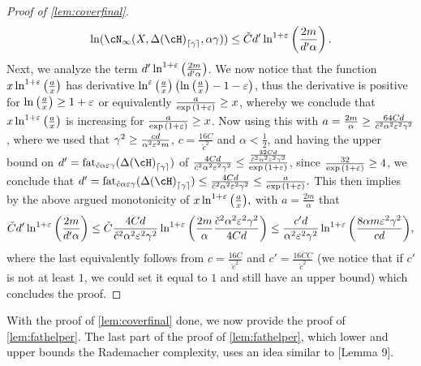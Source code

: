 \begin{proof}[Proof of \cref{lem:coverfinal}]
   \begin{align*}
       \ln(\cN_{\infty}(X, \dlh_{\left\lceil\gamma\right\rceil}, \alpha \gamma)) \leq
       \check{C} 
       d'
       \ln^{1+\eps}\left(\frac{2m}{d' \alpha}\right).
   \end{align*}
   Next, we analyze the term $d' \ln^{1+\varepsilon}\left(\frac{2m}{d' \alpha}\right)$. 
   We now notice that the function $ x\ln^{1+\varepsilon}{\left(\frac{a}{x} \right)} $  has derivative  $\ln^{\varepsilon}{\left(\frac{a}{x} \right)} \left(\ln{\left(\frac{a}{x} \right)}-1-\varepsilon \right)$, thus the derivative is positive for $ \ln{\left(\frac{a}{x} \right)}\geq 1+\varepsilon $ or equivalently $ \frac{ a }{\exp{\left(1+\varepsilon\right)}}\geq x $, whereby we conclude that $ x\ln^{1+\varepsilon}{\left(\frac{a}{x} \right)} $ is increasing for $ \frac{ a }{\exp{\left(1+\varepsilon\right)}}\geq x $. Now using this with $ a=\frac{2m}{\alpha}\geq \frac{64Cd}{\check{c}^2\alpha^2\varepsilon^2\gamma^2} $, where we used that $ \gamma^{2}\geq  \frac{cd}{\alpha^{2}\varepsilon^{2}m}$, $ c=\frac{16C}{\check{c}^{2}} $   and   $ \alpha < \frac{1}{2} $, and having the upper bound on $ d'=\fat_{\check{c}\alpha\eps\gamma}(\dlh_{\left\lceil\gamma\right\rceil}) $ of $ \frac{4Cd}{\check{c}^2\alpha^2\varepsilon^2\gamma^2} \leq \frac{\frac{32Cd}{\check{c}^2\alpha^2\varepsilon^2\gamma^2}}{ \exp{\left(1+\varepsilon\right)} } $, since $  \frac{32}{\exp{\left(1+\varepsilon\right)}}\geq 4  $, we conclude that $ d'=\fat_{\check{c}\alpha\eps\gamma}(\dlh_{\left\lceil\gamma\right\rceil})\leq \frac{4Cd}{\check{c}^2\alpha^2\eps^2\gamma^2}\leq \frac{a}{ \exp{\left(1+\eps \right)} }.$ This then implies by the above argued monotonicity of $ x\ln^{1+\varepsilon}{\left(\frac{a}{x} \right)}, $ with $ a=\frac{2m}{\alpha} $  that 
   \begin{align*}
       \check{C} 
       d'
       \ln^{1+\varepsilon}{\left(\frac{2m}{d'\alpha} \right)}
       \leq
       \check{C}\frac{4Cd}{\check{c}^2\alpha^2\varepsilon^2\gamma^2} \ln^{1+\varepsilon}{\left(\frac{2m}{\alpha }  \frac{\check{c}^2\alpha^2\varepsilon^2\gamma^2}{4Cd} \right)}
       \leq
       \frac{c'd}{\alpha^2\varepsilon^{2}\gamma^{2}} \ln^{1+\varepsilon}{\left(  \frac{8\alpha m\varepsilon^{2}\gamma^{2}}{cd} \right)},
   \end{align*}
   where the last equivalently follows from $ c=\frac{16C}{\check{c}^{2}} $ and $ c'=\frac{16\check{C}C}{\check{c}^{2}} $ (we notice that if $ c' $ is not at least $1$, we could set it equal to $ 1 $ and still have an upper bound)
   which concludes the proof. 
\end{proof}

With the proof of \cref{lem:coverfinal} done, we now provide the proof of \cref{lem:fathelper}. The last part of the proof of \cref{lem:fathelper}, which lower and upper bounds the Rademacher complexity, uses an idea similar to \cite{larsen2022optimalweakstronglearning} [Lemma 9].

